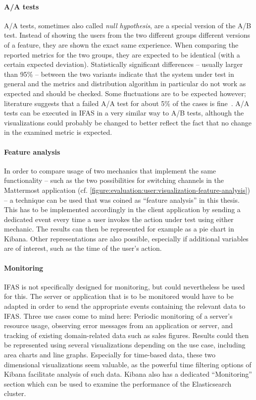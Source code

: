 \paragraph{A/A tests}
A/A tests, sometimes also called \emph{null hypothesis}, are a special version of the A/B test.
Instead of showing the users from the two different groups different versions of a feature, they are shown the exact same experience.
When comparing the reported metrics for the two groups, they are expected to be identical (with a certain expected deviation).
Statistically significant differences -- usually larger than 95\% -- between the two variants indicate that the system under test in general and the metrics and distribution algorithm in particular do not work as expected and should be checked.
Some fluctuations are to be expected however; literature suggests that a failed A/A test for about 5\% of the cases is fine~\cite{Kohavi2009}.
A/A tests can be executed in \ac{IFAS} in a very similar way to A/B tests, although the visualizations could probably be changed to better reflect the fact that no change in the examined metric is expected.

\paragraph{Feature analysis}
In order to compare usage of two mechanics that implement the same functionality -- such as the two possibilities for switching channels in the Mattermost application (cf. \cref{figure:evaluation:user:visualization-feature-analysis}) -- a technique can be used that was coined as ``feature analysis'' in this thesis.
This has to be implemented accordingly in the client application by sending a dedicated event every time a user invokes the action under test using either mechanic.
The results can then be represented for example as a pie chart in Kibana.
Other representations are also possible, especially if additional variables are of interest, such as the time of the user's action.

\paragraph{Monitoring}
\ac{IFAS} is not specifically designed for monitoring, but could nevertheless be used for this.
The server or application that is to be monitored would have to be adapted in order to send the appropriate events containing the relevant data to \ac{IFAS}.
Three use cases come to mind here: Periodic monitoring of a server's resource usage, observing error messages from an application or server, and tracking of existing domain-related data such as sales figures.
Results could then be represented using several visualizations depending on the use case, including area charts and line graphs.
Especially for time-based data, these two dimensional visualizations seem valuable, as the powerful time filtering options of Kibana facilitate analysis of such data.
Kibana also has a dedicated ``Monitoring'' section which can be used to examine the performance of the Elasticsearch cluster.
